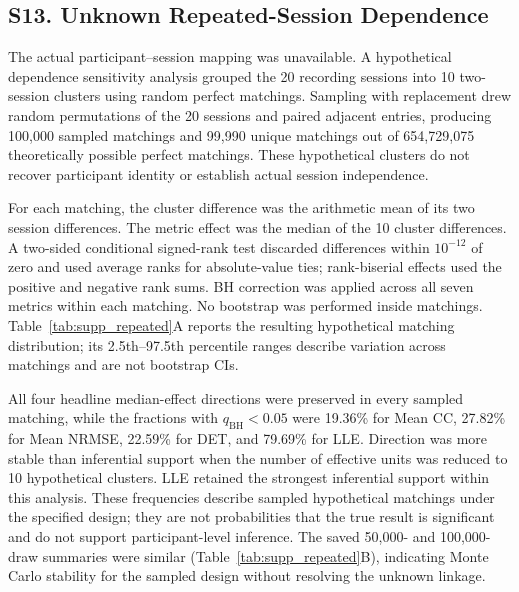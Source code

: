 \begin{table}[p]
\begin{minipage}{\textwidth}
\end{minipage}
\end{table}
\subsection*{S13. Unknown Repeated-Session Dependence}
The actual participant--session mapping was unavailable. A hypothetical dependence sensitivity analysis grouped the 20 recording sessions into 10 two-session clusters using random perfect matchings. Sampling with replacement drew random permutations of the 20 sessions and paired adjacent entries, producing 100,000 sampled matchings and 99,990 unique matchings out of 654,729,075 theoretically possible perfect matchings. These hypothetical clusters do not recover participant identity or establish actual session independence.

For each matching, the cluster difference was the arithmetic mean of its two session differences. The metric effect was the median of the 10 cluster differences. A two-sided conditional signed-rank test discarded differences within $10^{-12}$ of zero and used average ranks for absolute-value ties; rank-biserial effects used the positive and negative rank sums. BH correction was applied across all seven metrics within each matching. No bootstrap was performed inside matchings. Table~\ref{tab:supp_repeated}A reports the resulting hypothetical matching distribution; its 2.5th--97.5th percentile ranges describe variation across matchings and are not bootstrap CIs.

All four headline median-effect directions were preserved in every sampled matching, while the fractions with $q_{\mathrm{BH}}<0.05$ were 19.36\% for Mean CC, 27.82\% for Mean NRMSE, 22.59\% for DET, and 79.69\% for LLE. Direction was more stable than inferential support when the number of effective units was reduced to 10 hypothetical clusters. LLE retained the strongest inferential support within this analysis. These frequencies describe sampled hypothetical matchings under the specified design; they are not probabilities that the true result is significant and do not support participant-level inference. The saved 50,000- and 100,000-draw summaries were similar (Table~\ref{tab:supp_repeated}B), indicating Monte Carlo stability for the sampled design without resolving the unknown linkage.

